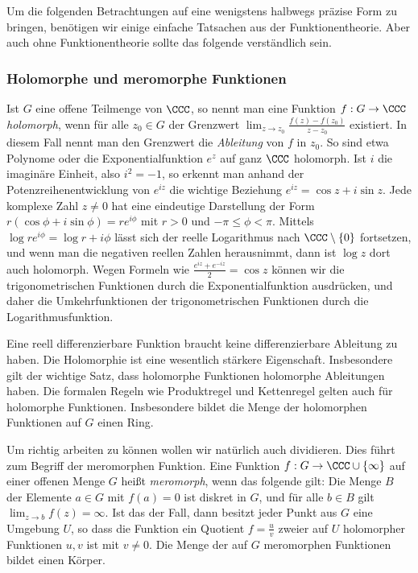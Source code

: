 \documentclass[12pt,a4paper,twoside]{article}
\newcommand{\ei}[1]{\emph{#1}\index{#1}}
\begin{document}
Um die folgenden Betrachtungen auf eine wenigstens halbwegs pr\"azise Form zu
bringen, ben\"otigen wir einige einfache Tatsachen aus der
Funktionentheorie. Aber auch ohne Funktionentheorie sollte das folgende
verst\"andlich sein.
\subsubsection{Holomorphe und meromorphe Funktionen}
Ist $G$ eine offene Teilmenge von $\CCC$, so nennt man eine Funktion
$f:G\to\CCC$ \ei{holomorph}, wenn f\"ur alle $z_0\in G$ der Grenzwert
$\lim_{z\to z_0}\frac{f(z)-f(z_0)}{z-z_0}$ existiert. In diesem Fall nennt man
den Grenzwert die \ei{Ableitung} von $f$ in $z_0$. So sind etwa Polynome oder
die Exponentialfunktion $e^z$ auf ganz $\CCC$ holomorph. Ist $i$ die
imagin\"are Einheit, also $i^2=-1$, so erkennt man anhand der
Potenzreihenentwicklung von $e^{iz}$ die wichtige Beziehung $e^{iz}=\cos
z+i\sin z$. Jede komplexe Zahl $z\ne0$ hat eine eindeutige Darstellung der
Form $r(\cos\phi+i\sin\phi)=re^{i\phi}$ mit $r>0$ und $-\pi\le\phi<\pi$.
Mittels $\log re^{i\phi}=\log r+i\phi$ l\"asst sich der reelle Logarithmus
nach $\CCC\setminus\{0\}$ fortsetzen, und wenn man die negativen reellen
Zahlen herausnimmt, dann ist $\log z$ dort auch holomorph. Wegen Formeln wie
$\frac{e^{iz}+e^{-iz}}{2}=\cos z$ k\"onnen wir die trigonometrischen
Funktionen durch die Exponentialfunktion ausdr\"ucken, und daher die
Umkehrfunktionen der trigonometrischen Funktionen durch die
Logarithmusfunktion.

Eine reell differenzierbare Funktion braucht keine differenzierbare Ableitung
zu haben. Die Holomorphie ist eine wesentlich st\"arkere
Eigenschaft. Insbesondere gilt der wichtige Satz, dass holomorphe Funktionen
holomorphe Ableitungen haben. Die formalen Regeln wie Produktregel und
Kettenregel gelten auch f\"ur holomorphe Funktionen. Insbesondere bildet die
Menge der holomorphen Funktionen auf $G$ einen Ring.

Um richtig arbeiten zu k\"onnen wollen wir nat\"urlich auch dividieren. Dies
f\"uhrt zum Begriff der meromorphen Funktion. Eine Funktion
$f:G\to\CCC\cup\{\infty\}$ auf einer offenen Menge $G$ hei\ss t
\ei{meromorph}, wenn das folgende gilt: Die Menge $B$ der Elemente $a\in G$
mit $f(a)=0$ ist diskret in $G$, und f\"ur alle $b\in B$ gilt $\lim_{z\to
  b}f(z)=\infty$. Ist das der Fall, dann besitzt jeder Punkt aus $G$ eine
Umgebung $U$, so dass die Funktion ein Quotient $f=\frac{u}{v}$ zweier auf $U$
holomorpher Funktionen $u,v$ ist mit $v\ne0$. Die Menge der auf $G$
meromorphen Funktionen bildet einen K\"orper.
\end{document}
